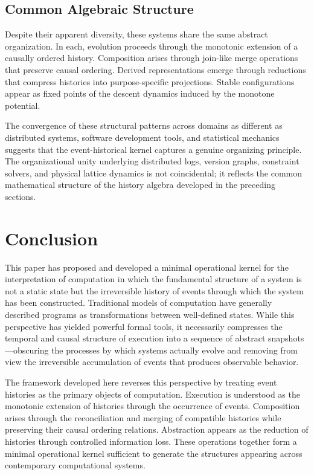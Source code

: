 \documentclass[12pt]{article}
\begin{document}
\subsection{Common Algebraic Structure}

Despite their apparent diversity, these systems share the same abstract organization. In each,
evolution proceeds through the monotonic extension of a causally ordered history. Composition
arises through join-like merge operations that preserve causal ordering. Derived representations
emerge through reductions that compress histories into purpose-specific projections. Stable
configurations appear as fixed points of the descent dynamics induced by the monotone potential.

The convergence of these structural patterns across domains as different as distributed systems,
software development tools, and statistical mechanics suggests that the event-historical kernel
captures a genuine organizing principle. The organizational unity underlying distributed logs,
version graphs, constraint solvers, and physical lattice dynamics is not coincidental; it
reflects the common mathematical structure of the history algebra developed in the preceding
sections.

\section{Conclusion}
\label{sec:conclusion}

This paper has proposed and developed a minimal operational kernel for the interpretation of
computation in which the fundamental structure of a system is not a static state but the
irreversible history of events through which the system has been constructed. Traditional models
of computation have generally described programs as transformations between well-defined states.
While this perspective has yielded powerful formal tools, it necessarily compresses the temporal
and causal structure of execution into a sequence of abstract snapshots---obscuring the
processes by which systems actually evolve and removing from view the irreversible accumulation
of events that produces observable behavior.

The framework developed here reverses this perspective by treating event histories as the
primary objects of computation. Execution is understood as the monotonic extension of histories
through the occurrence of events. Composition arises through the reconciliation and merging of
compatible histories while preserving their causal ordering relations. Abstraction appears as
the reduction of histories through controlled information loss. These operations together form a
minimal operational kernel sufficient to generate the structures appearing across contemporary
computational systems.
\end{document}
